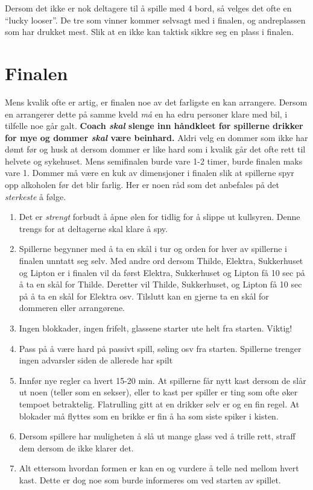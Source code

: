 \documentclass[10pt,a4paper,norsk,openany]{book}
\begin{document}
Dersom det ikke er nok deltagere til å spille med 4 bord, så velges det ofte en
``lucky looser''. De tre som vinner kommer selvsagt med i finalen, og
andreplassen som har drukket mest. Slik at en ikke kan taktisk sikkre seg en
plass i finalen.


\section{Finalen}

Mens kvalik ofte er artig, er finalen noe av det farligste en kan arrangere.
Dersom en arrangerer dette på samme kveld \emph{må} en ha edru personer klare
med bil, i tilfelle noe går galt. \textbf{Coach \emph{skal} slenge inn håndkleet
  før spillerne drikker for mye og dommer \emph{skal} være beinhard.} Aldri velg
en dommer som ikke har dømt før og husk at dersom dommer er like hard som i
kvalik går det ofte rett til helvete og sykehuset. Mens semifinalen burde vare
1-2 timer, burde finalen maks vare 1. Dommer må være en kuk av dimensjoner i
finalen slik at spillerne spyr opp alkoholen før det blir farlig. Her er noen
råd som det anbefales på det \emph{sterkeste} å følge. 

\begin{enumerate}
  \item Det er \emph{strengt} forbudt å åpne ølen for tidlig
    for å slippe ut kullsyren. Denne trengs for at deltagerne skal klare å spy.
  \item Spillerne begynner med å ta en skål i tur og orden for hver av
    spillerne i finalen
    unntatt seg selv. Med andre ord dersom Thilde, Elektra, Sukkerhuset og Lipton
    er i finalen vil da først Elektra, Sukkerhuset og Lipton få 10 sec på å ta
    en skål for Thilde. Deretter vil Thilde, Sukkerhuset, og Lipton få 10 sec på
    å ta en skål for Elektra osv. Tilslutt kan en gjerne ta en skål for
    dommeren eller arrangørene.
  \item Ingen blokkader, ingen frifelt, glassene starter ute helt fra starten.
    Viktig!
  \item Pass på å være hard på passivt spill, søling osv fra starten. Spillerne
    trenger ingen advarsler siden de allerede har spilt
  \item Innfør nye regler ca hvert 15-20 min. At spillerne får nytt kast dersom
    de slår ut noen (teller som en sekser), eller to kast per spiller er ting
    som ofte øker tempoet betraktelig. Flatrulling gitt at en drikker selv er og
    en fin regel. At blokader må flyttes som en brikke er fin å ha som siste
    spiker i kisten.
  \item Dersom spillere har muligheten å slå ut mange glass ved å trille rett,
    straff dem dersom de ikke klarer det.
  \item Alt ettersom hvordan formen er kan en og vurdere å telle ned mellom
    hvert kast. Dette er dog noe som burde informeres om ved starten av spillet.
\end{enumerate}
\end{document}
